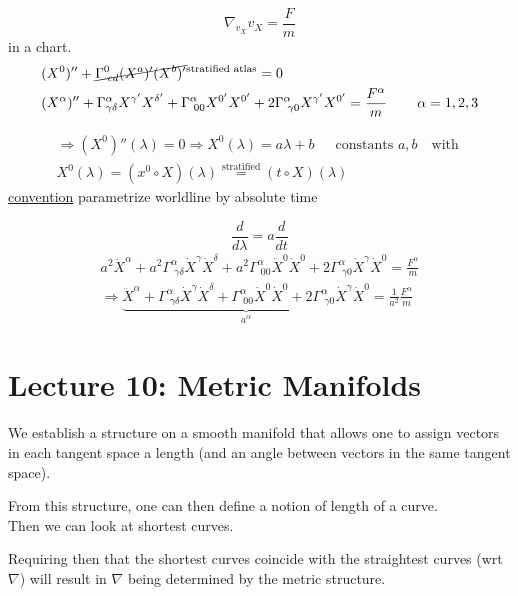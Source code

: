 \documentclass[10pt, twoside]{amsart}
\begin{document}
\begin{multicols*}{2}
\[
\nabla_{v_X} v_X = \frac{F}{m}
\]
in a chart.
\[
\begin{aligned}
& (X^0)'' + \cancel{ \Gamma^0_{ \, \, cd } (X^a)' (X^b)' }^{ \text{stratified atlas}} = 0  \\
  & (X^{\alpha})'' + \Gamma^{\alpha}_{\gamma \delta} X^{\gamma'} X^{\delta'} + \Gamma^{\alpha}_{ \, \, 00} X^{0'} X^{0'} + 2\Gamma^{\alpha}_{ \, \, \gamma 0} X^{\gamma'} X^{0'} = \frac{F^{\alpha}}{m} \quad \quad \, \alpha = 1,2,3
\end{aligned}
\]

\[
\begin{gathered}
\Longrightarrow (X^0)''(\lambda) = 0 \Longrightarrow X^0(\lambda) = a\lambda + b \quad \, \text{ constants $a,b$ } \text{ with  }  \\
X^0(\lambda) = (x^0 \circ X)(\lambda) \overset{\text{stratified}}{=} (t\circ X)(\lambda)
\end{gathered}
\]
\underline{convention} parametrize worldline by absolute time

\[
\frac{d}{d\lambda} = a \frac{d}{dt}
\]
\[
\begin{gathered}
a^2 \ddot{X}^{\alpha} + a^2 \Gamma^{\alpha}_{ \, \, \gamma \delta} \dot{X}^{\gamma} \dot{X}^{\delta} + a^2 \Gamma^{\alpha}_{ \, \, 00 } \dot{X}^0 \dot{X}^0 + 2\Gamma^{\alpha}_{ \, \,\gamma 0} \dot{X}^{\gamma} \dot{X}^{0} =  \frac{ F^{\alpha}}{ m} \\
\Longrightarrow  \underbrace{ \ddot{X}^{\alpha} +  \Gamma^{\alpha}_{ \, \, \gamma \delta} \dot{X}^{\gamma} \dot{X}^{\delta} +  \Gamma^{\alpha}_{ \, \, 00 } \dot{X}^0 \dot{X}^0 + 2\Gamma^{\alpha}_{ \, \,\gamma 0} \dot{X}^{\gamma} \dot{X}^{0} }_{a^{\alpha} } = \frac{1}{a^2} \frac{ F^{\alpha}}{ m} 
\end{gathered}
\]



\section{Lecture 10: Metric Manifolds}

We establish a structure on a smooth manifold that allows one to assign vectors in each tangent space a length (and an angle between vectors in the same tangent space).

From this structure, one can then define a notion of length of a curve. \\
Then we can look at shortest curves.

Requiring then that the shortest curves coincide with the straightest curves (wrt $\nabla$) will result in $\nabla$ being determined by the metric structure.  


\end{multicols*}
\end{document}
